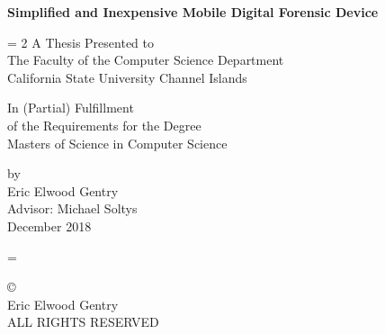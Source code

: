 \documentclass[12pt]{article}
\begin{document}
\begin{titlepage}
\begin{center}
{\Large \bfseries Simplified and Inexpensive Mobile Digital Forensic Device \par}

\vspace{2 cm}
\baselineskip = 2\baselineskip
A Thesis Presented to \\
The Faculty of the Computer Science Department\\
California State University Channel Islands

\vspace{1 cm}

In (Partial) Fulfillment\\
of the Requirements for the Degree\\
Masters of Science in Computer Science\\

\vspace{1 cm }

\vfill

by \\
Eric Elwood Gentry\\
Advisor: Michael Soltys\\
December 2018
\end{center}
\end{titlepage}
\baselineskip = \baselineskip

\newpage
\null
\vfill
\begin{flushleft}
\copyright{}\\
Eric Elwood Gentry\\
ALL RIGHTS RESERVED
\end{flushleft}
\newpage
\end{document}
